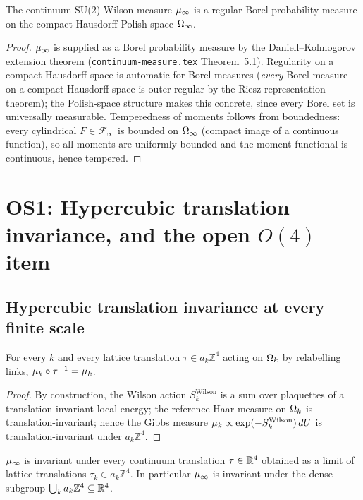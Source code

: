 \begin{theorem}
\label{thm:os0}
The continuum SU(2) Wilson measure $\mu_\infty$ is a regular Borel
probability measure on the compact Hausdorff Polish space $\Omega_\infty$.
\end{theorem}

\begin{proof}
$\mu_\infty$ is supplied as a Borel probability measure by the
Daniell--Kolmogorov extension theorem (\texttt{continuum-measure.tex}
Theorem~5.1).  Regularity on a compact Hausdorff space is automatic
for Borel measures (\emph{every} Borel measure on a compact Hausdorff
space is outer-regular by the Riesz representation theorem); the
Polish-space structure makes this concrete, since every Borel set is
universally measurable.  Temperedness of moments follows from
boundedness: every cylindrical $F \in \mathcal{F}_\infty$ is bounded
on $\Omega_\infty$ (compact image of a continuous function), so all moments
are uniformly bounded and the moment functional is continuous, hence
tempered.
\end{proof}

\section{OS1: Hypercubic translation invariance, and the open $O(4)$ item}
\label{sec:os1}

\subsection{Hypercubic translation invariance at every finite scale}

\begin{lemma}
\label{lem:translation-finite-k}
For every $k$ and every lattice translation $\tau \in a_k \mathbb{Z}^4$
acting on $\Omega_k$ by relabelling links, $\mu_k \circ \tau^{-1} = \mu_k$.
\end{lemma}

\begin{proof}
By construction, the Wilson action $S_k^{\mathrm{Wilson}}$ is a sum
over plaquettes of a translation-invariant local energy; the
reference Haar measure on $\Omega_k$ is translation-invariant; hence
the Gibbs measure $\mu_k \propto \exp(-S_k^{\mathrm{Wilson}}) \, dU$
is translation-invariant under $a_k \mathbb{Z}^4$.
\end{proof}

\begin{theorem}
\label{thm:os1-hypercubic}
$\mu_\infty$ is invariant under every continuum translation
$\tau \in \mathbb{R}^4$ obtained as a limit of lattice translations
$\tau_k \in a_k \mathbb{Z}^4$.  In particular $\mu_\infty$ is invariant
under the dense subgroup $\bigcup_k a_k \mathbb{Z}^4 \subseteq \mathbb{R}^4$.
\end{theorem}

